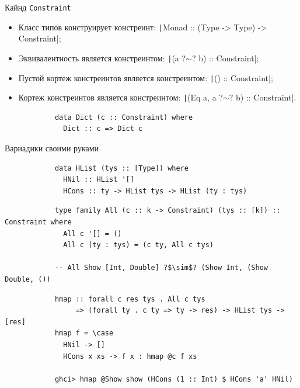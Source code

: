    \begin{frame}[fragile]{Кайнд \texttt{Constraint}}
        \pause
        \begin{itemize}
            \item Класс типов конструирует констреинт: \texttt|Monad :: (Type -> Type) -> Constraint|;
            \item Эквивалентность является констреинтом: \texttt|(a ?$\sim$? b) :: Constraint|;
            \item Пустой кортеж констреинтов является констреинтом: \texttt|() :: Constraint|;
            \item Кортеж констреинтов является констреинтом: \texttt|(Eq a, a ?$\sim$? b) :: Constraint|.
        \end{itemize}
        \pause\vspace{1em}
        \begin{verbatim}
            data Dict (c :: Constraint) where
              Dict :: c => Dict c
        \end{verbatim}
    \end{frame}

    \begin{frame}[fragile]{Вариадики своими руками}
        \pause
        \begin{verbatim}
            data HList (tys :: [Type]) where
              HNil :: HList '[]
              HCons :: ty -> HList tys -> HList (ty : tys)
        \end{verbatim}
        \pause\vspace{1em}
        \begin{verbatim}
            type family All (c :: k -> Constraint) (tys :: [k]) :: Constraint where
              All c '[] = ()
              All c (ty : tys) = (c ty, All c tys)

            -- All Show [Int, Double] ?$\sim$? (Show Int, (Show Double, ())
        \end{verbatim}
        \pause\vspace{1em}
        \begin{verbatim}
            hmap :: forall c res tys . All c tys
                 => (forall ty . c ty => ty -> res) -> HList tys -> [res]
            hmap f = \case
              HNil -> []
              HCons x xs -> f x : hmap @c f xs

            ghci> hmap @Show show (HCons (1 :: Int) $ HCons 'a' HNil)
        \end{verbatim}
    \end{frame}

